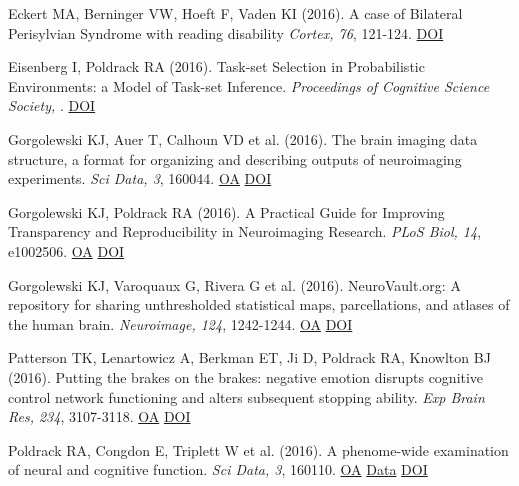 \documentclass[10pt, letterpaper]{article}
\begin{document}
Eckert MA, Berninger VW, Hoeft F, Vaden KI (2016). A case of Bilateral Perisylvian Syndrome with reading disability \textit{Cortex, 76}, 121-124. \href{http://dx.doi.org/10.1016/j.cortex.2016.01.004}{DOI} \vspace{2mm}

Eisenberg I, Poldrack RA (2016). Task-set Selection in Probabilistic Environments: a Model of Task-set Inference. \textit{Proceedings of Cognitive Science Society, }. \href{http://dx.doi.org/None}{DOI} \vspace{2mm}

Gorgolewski KJ, Auer T, Calhoun VD et al. (2016). The brain imaging data structure, a format for organizing and describing outputs of neuroimaging experiments. \textit{Sci Data, 3}, 160044. \href{https://www.ncbi.nlm.nih.gov/pmc/articles/PMC4978148}{OA} \href{http://dx.doi.org/10.1038/sdata.2016.44}{DOI} \vspace{2mm}

Gorgolewski KJ, Poldrack RA (2016). A Practical Guide for Improving Transparency and Reproducibility in Neuroimaging Research. \textit{PLoS Biol, 14}, e1002506. \href{https://www.ncbi.nlm.nih.gov/pmc/articles/PMC4936733}{OA} \href{http://dx.doi.org/10.1371/journal.pbio.1002506}{DOI} \vspace{2mm}

Gorgolewski KJ, Varoquaux G, Rivera G et al. (2016). NeuroVault.org: A repository for sharing unthresholded statistical maps, parcellations, and atlases of the human brain. \textit{Neuroimage, 124}, 1242-1244. \href{https://www.ncbi.nlm.nih.gov/pmc/articles/PMC4806527}{OA} \href{http://dx.doi.org/10.1016/j.neuroimage.2015.04.016}{DOI} \vspace{2mm}

Patterson TK, Lenartowicz A, Berkman ET, Ji D, Poldrack RA, Knowlton BJ (2016). Putting the brakes on the brakes: negative emotion disrupts cognitive control network functioning and alters subsequent stopping ability. \textit{Exp Brain Res, 234}, 3107-3118. \href{https://www.ncbi.nlm.nih.gov/pmc/articles/PMC5073018}{OA} \href{http://dx.doi.org/10.1007/s00221-016-4709-2}{DOI} \vspace{2mm}

Poldrack RA, Congdon E, Triplett W et al. (2016). A phenome-wide examination of neural and cognitive function. \textit{Sci Data, 3}, 160110. \href{https://www.ncbi.nlm.nih.gov/pmc/articles/PMC5139672}{OA} \href{https://openneuro.org/datasets/ds000030/versions/1.0.0}{Data} \href{http://dx.doi.org/10.1038/sdata.2016.110}{DOI} \vspace{2mm}
\end{document}
